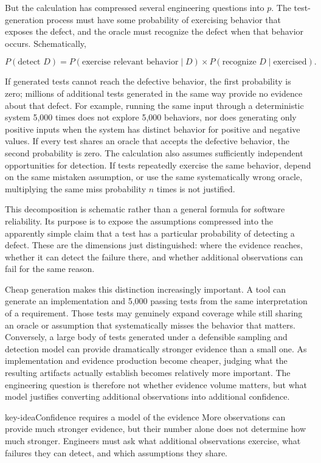But the calculation has compressed several engineering questions into \(p\). The test-generation
process must have some probability of exercising behavior that exposes the defect, and the oracle
must recognize the defect when that behavior occurs. Schematically,

\[P(\text{detect } D) = P(\text{exercise relevant behavior} \mid D) \times P(\text{recognize } D \mid \text{exercised}).\]

If generated tests cannot reach the defective behavior, the first probability is zero; millions of
additional tests generated in the same way provide no evidence about that defect. For example,
running the same input through a deterministic system 5,000 times does not explore 5,000
behaviors, nor does generating only positive inputs when the system has distinct behavior for
positive and negative values. If every test shares an oracle that accepts the defective behavior,
the second probability is zero. The calculation also assumes sufficiently independent
opportunities for detection. If tests repeatedly exercise the same behavior, depend on the same
mistaken assumption, or use the same systematically wrong oracle, multiplying the same miss
probability \(n\) times is not justified.

This decomposition is schematic rather than a general formula for software reliability. Its
purpose is to expose the assumptions compressed into the apparently simple claim that a test has a
particular probability of detecting a defect. These are the dimensions just distinguished: where
the evidence reaches, whether it can detect the failure there, and whether additional observations
can fail for the same reason.

Cheap generation makes this distinction increasingly important. A tool can generate an
implementation and 5,000 passing tests from the same interpretation of a requirement. Those tests
may genuinely expand coverage while still sharing an oracle or assumption that systematically
misses the behavior that matters. Conversely, a large body of tests generated under a defensible
sampling and detection model can provide dramatically stronger evidence than a small one. As
implementation and evidence production become cheaper, judging what the resulting artifacts
actually establish becomes relatively more important. The engineering question is therefore not
whether evidence volume matters, but what model justifies converting additional observations into
additional confidence.

\begin{bookbox}{key-idea}{Confidence requires a model of the evidence} %
More observations can provide much stronger evidence, but their number alone does not determine
how much stronger. Engineers must ask what additional observations exercise, what failures they
can detect, and which assumptions they share.
\end{bookbox}

